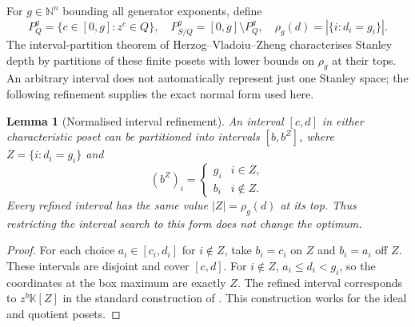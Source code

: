 \documentclass[11pt,a4paper]{article}
\newtheorem{lemma}[theorem]{Lemma}
\theoremstyle{remark}\newtheorem{remark}[theorem]{Remark}
\newcommand{\K}{\mathbb K}
\begin{document}
For $g\in\mathbb N^n$ bounding all generator exponents, define
\[
P_Q^g=\{c\in[0,g]:z^c\in Q\},\quad
P_{S/Q}^g=[0,g]\setminus P_Q^g,\quad
\rho_g(d)=|\{i:d_i=g_i\}|.
\]
The interval-partition theorem of Herzog--Vladoiu--Zheng \cite{HVZ} characterises Stanley depth by partitions of these finite posets with lower bounds on $\rho_g$ at their tops. An arbitrary interval does not automatically represent just one Stanley space; the following refinement supplies the exact normal form used here.

\begin{lemma}[Normalised interval refinement]\label{lem:normal}
An interval $[c,d]$ in either characteristic poset can be partitioned into intervals $[b,b^Z]$, where $Z=\{i:d_i=g_i\}$ and
\[
(b^Z)_i=\begin{cases}g_i&i\in Z,\\b_i&i\notin Z.\end{cases}
\]
Every refined interval has the same value $|Z|=\rho_g(d)$ at its top. Thus restricting the interval search to this form does not change the optimum.
\end{lemma}
\begin{proof}
For each choice $a_i\in[c_i,d_i]$ for $i\notin Z$, take $b_i=c_i$ on $Z$ and $b_i=a_i$ off $Z$. These intervals are disjoint and cover $[c,d]$. For $i\notin Z$, $a_i\le d_i<g_i$, so the coordinates at the box maximum are exactly $Z$. The refined interval corresponds to $z^b\K[Z]$ in the standard construction of \cite{HVZ}. This construction works for the ideal and quotient posets.
\end{proof}
\end{document}
